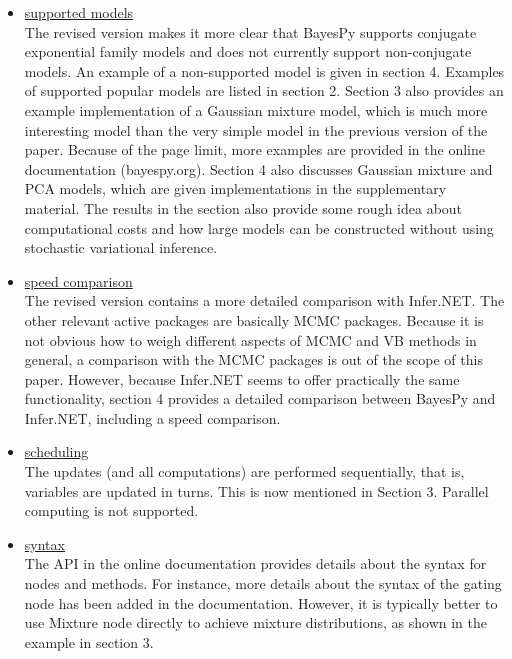\documentclass{article}
\begin{document}
\begin{itemize}

\item \underline{supported models}
  \\
  The revised version makes it more clear that BayesPy supports conjugate
  exponential family models and does not currently support non-conjugate models.
  An example of a non-supported model is given in section 4.  Examples of
  supported popular models are listed in section 2.  Section 3 also provides an
  example implementation of a Gaussian mixture model, which is much more
  interesting model than the very simple model in the previous version of the
  paper.  Because of the page limit, more examples are provided in the online
  documentation (bayespy.org).  Section 4 also discusses Gaussian mixture and
  PCA models, which are given implementations in the supplementary material.
  The results in the section also provide some rough idea about computational
  costs and how large models can be constructed without using stochastic
  variational inference.

\item \underline{speed comparison}
  \\
  The revised version contains a more detailed comparison with Infer.NET.  The
  other relevant active packages are basically MCMC packages.  Because it is not
  obvious how to weigh different aspects of MCMC and VB methods in general, a
  comparison with the MCMC packages is out of the scope of this paper.  However,
  because Infer.NET seems to offer practically the same functionality, section 4
  provides a detailed comparison between BayesPy and Infer.NET, including a
  speed comparison.

\item \underline{scheduling}
  \\
  The updates (and all computations) are performed sequentially, that is,
  variables are updated in turns.  This is now mentioned in Section 3.  Parallel
  computing is not supported.

\item \underline{syntax}
  \\
  The API in the online documentation provides details about the syntax for
  nodes and methods.  For instance, more details about the syntax of the gating
  node has been added in the documentation.  However, it is typically better to
  use Mixture node directly to achieve mixture distributions, as shown in the
  example in section 3.

\end{itemize}
\end{document}
